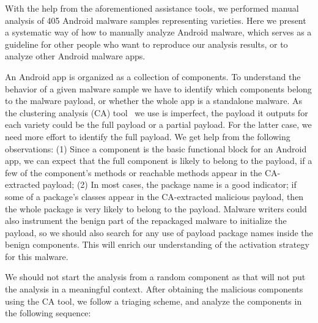 With the help from the aforementioned assistance tools, 
we performed manual analysis of 405 Android 
malware samples representing \versize varieties.
Here we present a systematic way of how to manually analyze Android malware, which 
serves as a guideline for other people who want to reproduce our analysis results, 
or to analyze other Android malware apps.

An Android app is organized as a collection of components. To understand the behavior of a given
malware sample we have to identify which components belong to the malware payload,
or whether the whole app is a standalone malware.
As the clustering analysis (CA) tool~\cite{li17:clustering} we use is imperfect, 
the payload it outputs for each variety
could be the full payload or a partial payload.
For the latter case, we need more effort to identify the full payload.
We get help from the following observations: 
(1) Since a component is the basic functional block for an Android app, we can expect that the full component is
likely to belong to the payload, if a few of the component's methods
or reachable methods appear in the CA-extracted payload;
(2) In most cases, the package name is a good indicator; if some of a package's classes appear in 
the CA-extracted malicious payload, then the whole package is very likely to belong to the payload.
Malware writers could also instrument the benign part of the repackaged malware
to initialize the payload, so we should also search for any use of payload package names inside
the benign components. This will enrich our understanding of the activation strategy for this malware.


We should not start the analysis from a random component as that will not put the analysis in a meaningful context. 
After obtaining the malicious components using the CA tool,
we follow a triaging scheme, and analyze the components in the following sequence:

